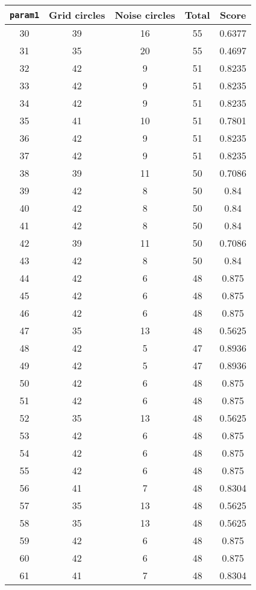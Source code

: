 \documentclass[letterpaper, 12pt]{article}
\begin{document}
\begin{longtable}{|c|c|c|c|c|}
\hline
\textbf{\texttt{param1}} & \textbf{Grid circles} & \textbf{Noise circles} & \textbf{Total} & \textbf{Score} \\
\hline
30 & 39 & 16 & 55 & 0.6377 \\
\hline
31 & 35 & 20 & 55 & 0.4697 \\
\hline
32 & 42 & 9 & 51 & 0.8235 \\
\hline
33 & 42 & 9 & 51 & 0.8235 \\
\hline
34 & 42 & 9 & 51 & 0.8235 \\
\hline
35 & 41 & 10 & 51 & 0.7801 \\
\hline
36 & 42 & 9 & 51 & 0.8235 \\
\hline
37 & 42 & 9 & 51 & 0.8235 \\
\hline
38 & 39 & 11 & 50 & 0.7086 \\
\hline
39 & 42 & 8 & 50 & 0.84 \\
\hline
40 & 42 & 8 & 50 & 0.84 \\
\hline
41 & 42 & 8 & 50 & 0.84 \\
\hline
42 & 39 & 11 & 50 & 0.7086 \\
\hline
43 & 42 & 8 & 50 & 0.84 \\
\hline
44 & 42 & 6 & 48 & 0.875 \\
\hline
45 & 42 & 6 & 48 & 0.875 \\
\hline
46 & 42 & 6 & 48 & 0.875 \\
\hline
47 & 35 & 13 & 48 & 0.5625 \\
\hline
48 & 42 & 5 & 47 & 0.8936 \\
\hline
49 & 42 & 5 & 47 & 0.8936 \\
\hline
50 & 42 & 6 & 48 & 0.875 \\
\hline
51 & 42 & 6 & 48 & 0.875 \\
\hline
52 & 35 & 13 & 48 & 0.5625 \\
\hline
53 & 42 & 6 & 48 & 0.875 \\
\hline
54 & 42 & 6 & 48 & 0.875 \\
\hline
55 & 42 & 6 & 48 & 0.875 \\
\hline
56 & 41 & 7 & 48 & 0.8304 \\
\hline
57 & 35 & 13 & 48 & 0.5625 \\
\hline
58 & 35 & 13 & 48 & 0.5625 \\
\hline
59 & 42 & 6 & 48 & 0.875 \\
\hline
60 & 42 & 6 & 48 & 0.875 \\
\hline
61 & 41 & 7 & 48 & 0.8304 \\

\end{longtable}
\end{document}
